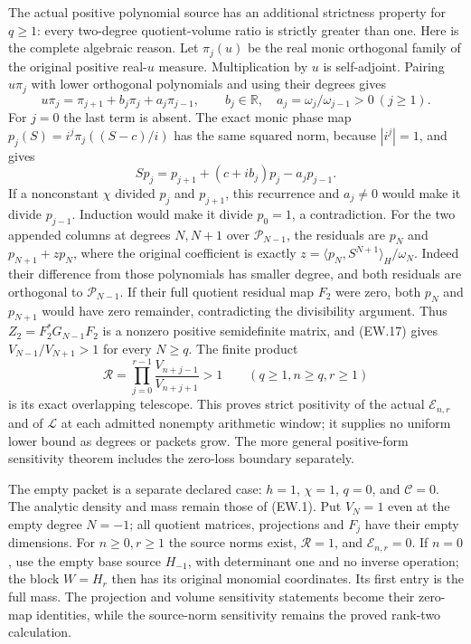 \documentclass[11pt]{article}
\newcommand{\R}{\mathbb R}
\begin{document}
The actual positive polynomial source has an additional strictness
property for $q\ge1$: every two-degree quotient-volume ratio is
strictly greater than one. Here is the complete algebraic reason.
Let $\pi_j(u)$ be the real monic orthogonal family of the original
positive real-$u$ measure. Multiplication by $u$ is self-adjoint.
Pairing $u\pi_j$ with lower orthogonal polynomials and using their
degrees gives
\[
 u\pi_j=\pi_{j+1}+b_j\pi_j+a_j\pi_{j-1},\qquad
 b_j\in\R,\quad a_j=\omega_j/\omega_{j-1}>0\ (j\ge1).
\]
For $j=0$ the last term is absent. The exact monic phase map
$p_j(S)=i^j\pi_j((S-c)/i)$ has the same squared norm, because
$|i^j|=1$, and gives
\[
 S p_j=p_{j+1}+(c+ib_j)p_j-a_jp_{j-1}. 
\]
If a nonconstant $\chi$ divided $p_j$ and $p_{j+1}$, this
recurrence and $a_j\ne0$ would make it divide $p_{j-1}$.
Induction would make it divide $p_0=1$, a contradiction.
For the two appended columns at degrees $N,N+1$ over
$\mathcal P_{N-1}$, the residuals are $p_N$ and
$p_{N+1}+z p_N$, where the original coefficient is exactly
$z=\langle p_N,S^{N+1}\rangle_H/\omega_N$.
Indeed their difference from those polynomials has smaller degree,
and both residuals are orthogonal to $\mathcal P_{N-1}$.
If their full quotient residual map $F_2$ were zero, both $p_N$
and $p_{N+1}$ would have zero remainder, contradicting the
divisibility argument. Thus $Z_2=F_2^*G_{N-1}F_2$ is a
nonzero positive semidefinite matrix, and (EW.17) gives
$V_{N-1}/V_{N+1}>1$ for every $N\ge q$.
The finite product
\[
 \mathscr R=\prod_{j=0}^{r-1}
                  \frac{V_{n+j-1}}{V_{n+j+1}}>1
 \qquad(q\ge1,n\ge q,r\ge1)                                \tag{EW.46a}
\]
is its exact overlapping telescope. This proves strict positivity
of the actual $\mathcal E_{n,r}$ and of $\mathscr L$ at each
admitted nonempty arithmetic window; it supplies no uniform lower
bound as degrees or packets grow. The more general positive-form
sensitivity theorem includes the zero-loss boundary separately.

The empty packet is a separate declared case: $h=1$, $\chi=1$,
$q=0$, and $\mathcal C=0$. The analytic density and mass remain
those of (EW.1). Put $V_N=1$ even at the empty degree $N=-1$;
all quotient matrices, projections and $F_j$ have their empty
dimensions. For $n\ge0,r\ge1$ the source norms exist,
$\mathscr R=1$, and $\mathcal E_{n,r}=0$. If $n=0$, use the
empty base source $H_{-1}$, with determinant one and no inverse
operation; the block $W=H_r$ then has its original monomial
coordinates. Its first entry is the full mass. The projection and
volume sensitivity statements become their zero-map identities,
while the source-norm sensitivity remains the proved rank-two
calculation.
\end{document}
